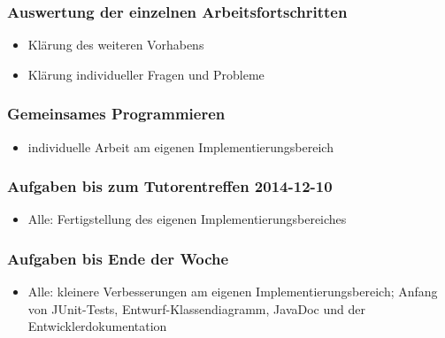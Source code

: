 \documentclass[12pt,a4paper]{article}
\begin{document}
\subsubsection*{Auswertung der einzelnen Arbeitsfortschritten}
\begin{itemize}
\item Klärung des weiteren Vorhabens
\item Klärung individueller Fragen und Probleme
\end{itemize}

\subsubsection*{Gemeinsames Programmieren}
\begin{itemize}
\item individuelle Arbeit am eigenen Implementierungsbereich
\end{itemize}

\subsubsection*{Aufgaben bis zum Tutorentreffen 2014-12-10}
\begin{itemize}
\item Alle: Fertigstellung des eigenen Implementierungsbereiches
\end{itemize}

\subsubsection*{Aufgaben bis Ende der Woche}
\begin{itemize}
\item Alle: kleinere Verbesserungen am eigenen Implementierungsbereich; Anfang von JUnit-Tests, Entwurf-Klassendiagramm, JavaDoc und der Entwicklerdokumentation
\end{itemize}
\end{document}
